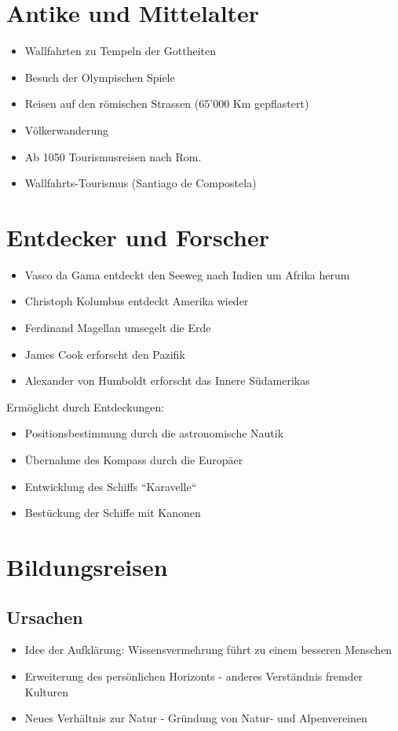 \documentclass{report}
\begin{document}
\section{Antike und Mittelalter}
\begin{itemize}
	\item Wallfahrten zu Tempeln der Gottheiten
	\item Besuch der Olympischen Spiele
	\item Reisen auf den römischen Strassen (65’000 Km gepflastert)
	\item Völkerwanderung
	\item Ab 1050 Tourismusreisen nach Rom. 
	\item Wallfahrts-Tourismus (Santiago de Compostela)
\end{itemize}

\section{Entdecker und Forscher}
\begin{itemize}
	\item Vasco da Gama entdeckt den Seeweg nach Indien um Afrika herum
	\item Christoph Kolumbus entdeckt Amerika wieder
	\item Ferdinand Magellan umsegelt die Erde
	\item James Cook erforscht den Pazifik
	\item Alexander von Humboldt erforscht das Innere Südamerikas
\end{itemize}
Ermöglicht durch Entdeckungen:
\begin{itemize}
	\item Positionsbestimmung durch die astronomische Nautik
	\item Übernahme des Kompass durch die Europäer
	\item Entwicklung des Schiffs ``Karavelle``
	\item Bestückung der Schiffe mit Kanonen
\end{itemize}
\newpage

\section{Bildungsreisen}
\subsection{Ursachen}
\begin{itemize}
	\item Idee der Aufklärung: Wissensvermehrung führt zu einem besseren Menschen
	\item Erweiterung des persönlichen Horizonts - anderes Verständnis fremder Kulturen
	\item Neues Verhältnis zur Natur - Gründung von Natur- und Alpenvereinen
\end{itemize}
\end{document}
